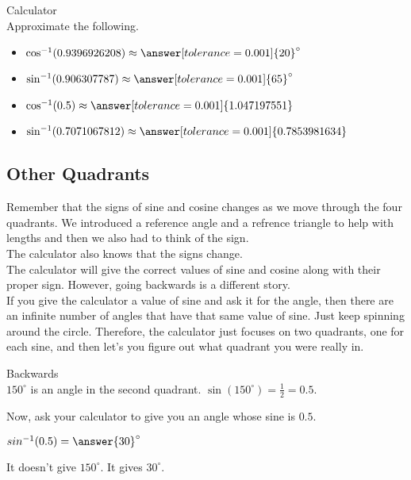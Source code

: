 \documentclass{ximera}
\begin{document}
\begin{question} Calculator \\

Approximate the following.

\begin{itemize}
\item $\cos^{-1}(0.9396926208) \approx \answer[tolerance=0.001]{20}^{\circ}$
\item $\sin^{-1}(0.906307787) \approx \answer[tolerance=0.001]{65}^{\circ}$
\item $\cos^{-1}(0.5) \approx \answer[tolerance=0.001]{1.047197551}$
\item $\sin^{-1}(0.7071067812) \approx \answer[tolerance=0.001]{0.7853981634}$
\end{itemize}

\end{question}




\subsection{Other Quadrants}

Remember that the signs of sine and cosine changes as we move through the four quadrants.  We introduced a reference angle and a refrence triangle to help with lengths and then we also had to think of the sign. \\

The calculator also knows that the signs change. \\

The calculator will give the correct values of sine and cosine along with their proper sign.  However, going backwards is a different story. \\

If you give the calculator a value of sine and ask it for the angle, then there are an infinite number of angles that have that same value of sine.  Just keep spinning around the circle. Therefore, the calculator just focuses on two quadrants, one for each sine, and then let's you figure out what quadrant you were really in.











\begin{question} Backwards \\

$150^{\circ}$ is an angle in the second quadrant. $\sin(150^{\circ}) = \frac{1}{2} = 0.5$.


Now, ask your calculator to give you an angle whose sine is $0.5$.


$sin^{-1}(0.5) = \answer{30}^{\circ}$


It doesn't give $150^{\circ}$.  It gives $30^{\circ}$.

\end{question}
\end{document}
